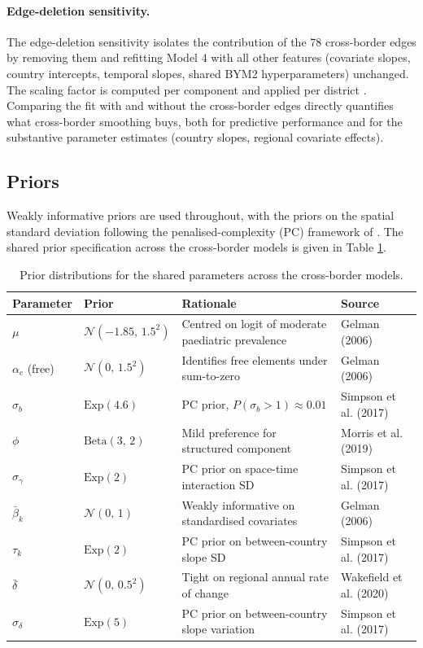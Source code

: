 \documentclass{article}
\begin{document}
\paragraph{Edge-deletion sensitivity.}

The edge-deletion sensitivity isolates the contribution of the 78
cross-border edges by removing them and refitting Model 4 with all other
features (covariate slopes, country intercepts, temporal slopes, shared
BYM2 hyperparameters) unchanged. The scaling factor is computed per
component and applied per district \citep{freni2018}. Comparing the fit
with and without the cross-border edges directly quantifies what
cross-border smoothing buys, both for predictive performance and for the
substantive parameter estimates (country slopes, regional covariate
effects).

\subsection{Priors}\label{priors}

\label{sec:priors}

Weakly informative priors are used throughout, with the priors on the
spatial standard deviation following the penalised-complexity (PC)
framework of \citep{simpson2017}. The shared prior specification across
the cross-border models is given in Table \ref{tab:priors}.

\begin{table}[!h]
\centering
\caption{\label{tab:priors}Prior distributions for the shared parameters across the cross-border models. \label{tab:priors}}
\centering
\fontsize{8}{10}\selectfont
\begin{tabular}[t]{llll}
\toprule
Parameter & Prior & Rationale & Source\\
\midrule
$\mu$ & $\mathcal{N}(-1.85,\, 1.5^2)$ & Centred on logit of moderate paediatric prevalence & Gelman (2006)\\
$\alpha_c$ (free) & $\mathcal{N}(0,\, 1.5^2)$ & Identifies free elements under sum-to-zero & Gelman (2006)\\
$\sigma_b$ & $\mathrm{Exp}(4.6)$ & PC prior, $P(\sigma_b > 1) \approx 0.01$ & Simpson et al. (2017)\\
$\phi$ & $\mathrm{Beta}(3,\, 2)$ & Mild preference for structured component & Morris et al. (2019)\\
$\sigma_\gamma$ & $\mathrm{Exp}(2)$ & PC prior on space-time interaction SD & Simpson et al. (2017)\\
\addlinespace
$\bar\beta_k$ & $\mathcal{N}(0,\, 1)$ & Weakly informative on standardised covariates & Gelman (2006)\\
$\tau_k$ & $\mathrm{Exp}(2)$ & PC prior on between-country slope SD & Simpson et al. (2017)\\
$\bar\delta$ & $\mathcal{N}(0,\, 0.5^2)$ & Tight on regional annual rate of change & Wakefield et al. (2020)\\
$\sigma_\delta$ & $\mathrm{Exp}(5)$ & PC prior on between-country slope variation & Simpson et al. (2017)\\
\bottomrule
\end{tabular}
\end{table}
\end{document}
